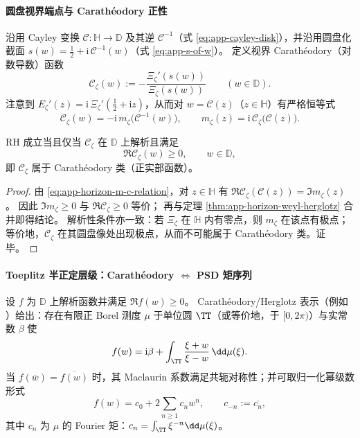 \paragraph{圆盘视界端点与 Carath\'eodory 正性}
沿用 Cayley 变换 \(\mathcal{C}:\mathbb{H}\to\mathbb{D}\) 及其逆 \(\mathcal{C}^{-1}\)（式 \eqref{eq:app-cayley-disk}），并沿用圆盘化截面 \(s(w)=\tfrac12+\mathrm{i}\,\mathcal{C}^{-1}(w)\)（式 \eqref{eq:app-s-of-w}）。
定义视界 Carath\'eodory（对数导数）函数
\begin{equation}\label{eq:app-horizon-carath-def}
\boxed{\;
\mathscr{C}_{\zeta}(w):=-\frac{\Xi_{\zeta}'(s(w))}{\Xi_{\zeta}(s(w))}\qquad(w\in\mathbb{D}).\;}
\end{equation}
注意到 \(E_{\zeta}'(z)=\mathrm{i}\,\Xi_{\zeta}'(\tfrac12+\mathrm{i}z)\)，从而对 \(w=\mathcal{C}(z)\)（\(z\in\mathbb{H}\)）有严格恒等式
\begin{equation}\label{eq:app-horizon-m-c-relation}
\boxed{\;
\mathscr{C}_{\zeta}(w)=-\mathrm{i}\,m_{\zeta}\!\bigl(\mathcal{C}^{-1}(w)\bigr),\qquad
m_{\zeta}(z)=\mathrm{i}\,\mathscr{C}_{\zeta}\!\bigl(\mathcal{C}(z)\bigr).\;}
\end{equation}

\begin{corollary}[RH 的圆盘正性形式]\label{cor:app-horizon-carath-rh}
RH 成立当且仅当 \(\mathscr{C}_{\zeta}\) 在 \(\mathbb{D}\) 上解析且满足
\[
\Re \mathscr{C}_{\zeta}(w)\ge 0,\qquad w\in\mathbb{D},
\]
即 \(\mathscr{C}_{\zeta}\) 属于 Carath\'eodory 类（正实部函数）。
\end{corollary}

\begin{proof}
由 \eqref{eq:app-horizon-m-c-relation}，对 \(z\in\mathbb{H}\) 有
\(\Re \mathscr{C}_{\zeta}(\mathcal{C}(z))=\Im m_{\zeta}(z)\)。
因此 \(\Im m_{\zeta}\ge 0\) 与 \(\Re\mathscr{C}_{\zeta}\ge 0\) 等价；
再与定理 \ref{thm:app-horizon-weyl-herglotz} 合并即得结论。
解析性条件亦一致：若 \(\Xi_{\zeta}\) 在 \(\mathbb{H}\) 内有零点，则 \(m_{\zeta}\) 在该点有极点；等价地，\(\mathscr{C}_{\zeta}\) 在其圆盘像处出现极点，从而不可能属于 Carath\'eodory 类。证毕。
\end{proof}

\paragraph{Toeplitz 半正定层级：Carath\'eodory \texorpdfstring{$\Leftrightarrow$}{<->} PSD 矩序列}
设 \(f\) 为 \(\mathbb{D}\) 上解析函数并满足 \(\Re f(w)\ge 0\)。
Carath\'eodory/Herglotz 表示（例如 \cite{Duren1970TheoryHp,Garnett2007BoundedAnalyticFunctions,Simon2005OPUC1}）给出：存在有限正 Borel 测度 \(\mu\) 于单位圆 \(\TT\)（或等价地，于 \([0,2\pi)\)）与实常数 \(\beta\) 使
\begin{equation}\label{eq:app-horizon-herglotz-disk}
f(w)=\mathrm{i}\beta+\int_{\TT}\frac{\xi+w}{\xi-w}\,\dd\mu(\xi).
\end{equation}
当 \(f(\overline w)=\overline{f(w)}\) 时，其 Maclaurin 系数满足共轭对称性；并可取归一化幂级数形式
\begin{equation}\label{eq:app-horizon-carath-series}
f(w)=c_0+2\sum_{n\ge 1}c_n w^n,\qquad c_{-n}:=\overline{c_n},
\end{equation}
其中 \(c_n\) 为 \(\mu\) 的 Fourier 矩：\(c_n=\int_{\TT}\xi^{-n}\dd\mu(\xi)\)。

